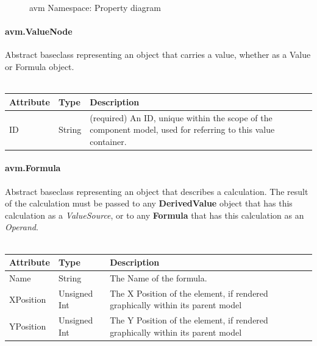 \begin{figure}[h!]
\caption{avm Namespace: Property diagram}
\label{Property_diagram}
\end{figure}

\paragraph{avm.ValueNode}
Abstract baseclass representing an object that carries a value, whether as a Value or Formula object.
\\ \\ 
\begin{tabular}{ l l p{9.5cm} }
\textbf{Attribute} & \textbf{Type} & \textbf{Description} \\ \hline
ID & String & (required) An ID, unique within the scope of the component model, used for referring to this value container. \\ \hline
\end{tabular}

\paragraph{avm.Formula}
Abstract baseclass representing an object that describes a calculation. The result of the calculation must be passed to any \textbf{DerivedValue} object that has this calculation as a \textit{ValueSource}, or to any \textbf{Formula} that has this calculation as an \textit{Operand}.
\\ \\
\begin{tabular}{ l l p{9.5cm} }
\textbf{Attribute} & \textbf{Type} & \textbf{Description} \\ \hline
Name & String & The Name of the formula. \\ \hline
XPosition & Unsigned Int & The X Position of the element, if rendered graphically within its parent model \\ \hline
YPosition & Unsigned Int & The Y Position of the element, if rendered graphically within its parent model \\ \hline
\end{tabular}

